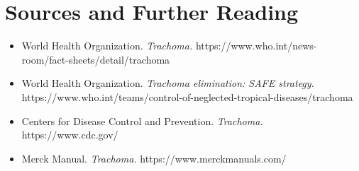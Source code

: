 \section*{Sources and Further Reading}
\begin{itemize}
    \item World Health Organization. \textit{Trachoma.} https://www.who.int/news-room/fact-sheets/detail/trachoma
    \item World Health Organization. \textit{Trachoma elimination: SAFE strategy.} https://www.who.int/teams/control-of-neglected-tropical-diseases/trachoma
    \item Centers for Disease Control and Prevention. \textit{Trachoma.} https://www.cdc.gov/
    \item Merck Manual. \textit{Trachoma.} https://www.merckmanuals.com/
\end{itemize}
